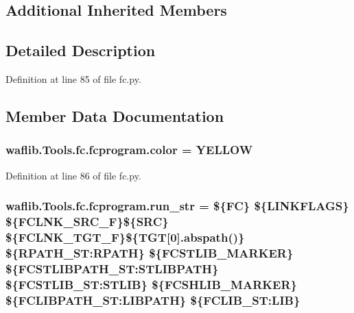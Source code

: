 \subsection*{Additional Inherited Members}


\subsection{Detailed Description}


Definition at line 85 of file fc.\+py.



\subsection{Member Data Documentation}
\subsubsection[{\texorpdfstring{color}{color}}]{ waflib.\+Tools.\+fc.\+fcprogram.\+color = \textquotesingle{}Y\+E\+L\+L\+OW\textquotesingle{}\hspace{0.3cm}{\ttfamily [static]}}\hypertarget{classwaflib_1_1_tools_1_1fc_1_1fcprogram_a71f28eb40e0c19ec05d8f1899a66ed93}{}\label{classwaflib_1_1_tools_1_1fc_1_1fcprogram_a71f28eb40e0c19ec05d8f1899a66ed93}


Definition at line 86 of file fc.\+py.

\subsubsection[{\texorpdfstring{run\+\_\+str}{run_str}}]{ waflib.\+Tools.\+fc.\+fcprogram.\+run\+\_\+str = \textquotesingle{}\$\{FC\} \$\{L\+I\+N\+K\+F\+L\+A\+GS\} \$\{F\+C\+L\+N\+K\+\_\+\+S\+R\+C\+\_\+F\}\$\{S\+RC\} \$\{F\+C\+L\+N\+K\+\_\+\+T\+G\+T\+\_\+F\}\$\{T\+GT\mbox{[}0\mbox{]}.abspath()\} \$\{R\+P\+A\+T\+H\+\_\+\+S\+T\+:\+R\+P\+A\+TH\} \$\{F\+C\+S\+T\+L\+I\+B\+\_\+\+M\+A\+R\+K\+ER\} \$\{F\+C\+S\+T\+L\+I\+B\+P\+A\+T\+H\+\_\+\+S\+T\+:\+S\+T\+L\+I\+B\+P\+A\+TH\} \$\{F\+C\+S\+T\+L\+I\+B\+\_\+\+S\+T\+:\+S\+T\+L\+IB\} \$\{F\+C\+S\+H\+L\+I\+B\+\_\+\+M\+A\+R\+K\+ER\} \$\{F\+C\+L\+I\+B\+P\+A\+T\+H\+\_\+\+S\+T\+:\+L\+I\+B\+P\+A\+TH\} \$\{F\+C\+L\+I\+B\+\_\+\+S\+T\+:\+L\+IB\}\textquotesingle{}\hspace{0.3cm}{\ttfamily [static]}}\hypertarget{classwaflib_1_1_tools_1_1fc_1_1fcprogram_ab52d4d1babe16531a4097da0935a79ab}{}\label{classwaflib_1_1_tools_1_1fc_1_1fcprogram_ab52d4d1babe16531a4097da0935a79ab}


